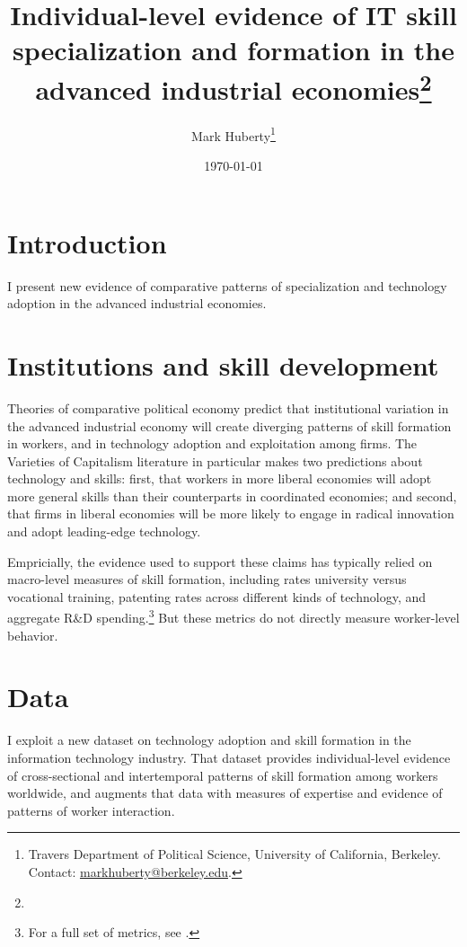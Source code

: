 \documentclass[11pt]{article}
\title{Individual-level evidence of IT skill specialization and formation
  in the advanced industrial economies\thanks{}}
\author{Mark Huberty\thanks{Travers Department of Political Science,
    University of California, Berkeley. Contact:
    \url{markhuberty@berkeley.edu}.}}
\date{\today}
\begin{document}
\maketitle
\doublespacing

\section{Introduction}
\label{sec:introduction}
 
I present new evidence of comparative patterns of specialization and
technology adoption in the advanced industrial economies. 

\section{Institutions and skill development}
\label{sec:inst-skill-devel}


Theories of comparative political economy predict that institutional
variation in the advanced industrial economy will create diverging
patterns of skill formation in workers, and in technology adoption and
exploitation among firms. The Varieties of Capitalism literature in
particular \citep{Hall:2001} makes two predictions about technology
and skills: first, that workers in more liberal economies
will adopt more general skills than their counterparts in coordinated
economies; and second, that firms in liberal economies will be more
likely to engage in radical innovation and adopt leading-edge
technology. 

Empricially, the evidence used to support these claims has typically
relied on macro-level measures of skill formation, including
rates university versus vocational training, patenting rates across
different kinds of technology, and aggregate R\&D
spending.\footnote{For a full set of metrics, see
  \cite{hall2009varieties}.} But these metrics do not directly measure
worker-level behavior.

\section{Data}
\label{sec:data}

I exploit a new dataset on technology adoption and skill formation in
the information technology industry. That dataset provides
individual-level evidence of cross-sectional and intertemporal
patterns of skill formation among workers worldwide, and augments that
data with measures of expertise and evidence of patterns of worker
interaction. 
\end{document}
